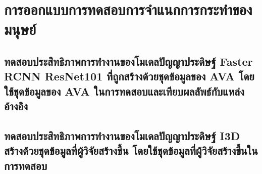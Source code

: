 \section{การออกแบบการทดสอบการจำแนกการกระทำของมนุษย์}
\subsection{ทดสอบประสิทธิภาพการทำงานของโมเดลปัญญาประดิษฐ์ Faster RCNN ResNet101 ที่ถูกสร้างด้วยชุดข้อมูลของ AVA โดยใช้ชุดข้อมูลของ AVA ในการทดสอบและเทียบผลลัพธ์กับแหล่งอ้างอิง}

\clearpage
\subsection{ทดสอบประสิทธิภาพการทำงานของโมเดลปัญญาประดิษฐ์ I3D สร้างด้วยชุดข้อมูลที่ผู้วิจัยสร้างขึ้น โดยใช้ชุดข้อมูลที่ผู้วิจัยสร้างขึ้นในการทดสอบ}
